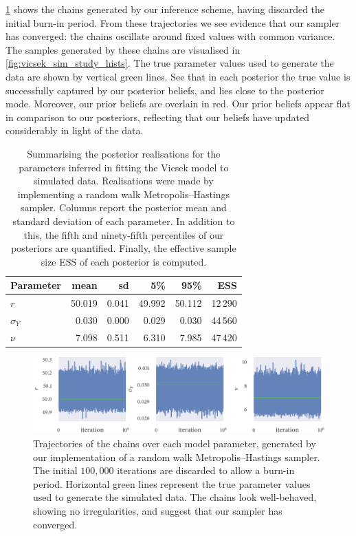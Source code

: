 \cref{fig:vicsek_sim_study_chains} shows the chains generated by our inference scheme,
having discarded the initial burn-in period. From these trajectories we see evidence that
our sampler has converged: the chains oscillate around fixed values with common
variance.  The samples generated by these chains are visualised in
\cref{fig:vicsek_sim_study_hists}.  The true parameter values used to generate the data
are shown by vertical green lines. See that in each posterior the true value is
successfully captured by our posterior beliefs, and lies close to the posterior mode.
Moreover, our prior beliefs are overlain in red. Our prior beliefs appear flat in
comparison to our posteriors, reflecting that our beliefs have updated considerably in
light of the data.
\begin{table}[tb]
  \begin{tabular}{@{}lrrrrr@{}}
    \toprule
    Parameter    & mean   & sd    & 5\%    & 95\%   & ESS \\
    \midrule
    $r$          & 50.019 & 0.041 & 49.992 & 50.112 & 12\,290            \\
    $\sigma_{Y}$ & 0.030  & 0.000 & 0.029  & 0.030  & 44\,560            \\
    $\nu$        & 7.098  & 0.511 & 6.310  & 7.985  & 47\,420            \\
    \bottomrule
  \end{tabular}
  \caption{Summarising the posterior realisations for the parameters inferred in fitting the
    Vicsek model to simulated data. Realisations were made by implementing a random walk
    Metropolis--Hastings sampler. Columns report the posterior mean and standard deviation
    of each parameter. In addition to this, the fifth and ninety-fifth percentiles of our
    posteriors are quantified. Finally, the effective sample size ESS of
    each posterior is computed.}
  \label{tab:vicsek_sim_study_summary}
\end{table}
\begin{figure}[tb]
  \includegraphics{mh_r_trace.pdf}
  \caption{Trajectories of the chains over each model parameter, generated by our
      implementation of a random walk Metropolis--Hastings sampler. The initial $100,000$
      iterations are discarded to allow a burn-in period. Horizontal green lines represent
      the true parameter values used to generate the simulated data. The chains look
      well-behaved, showing no irregularities, and suggest that our sampler has converged.}
  \label{fig:vicsek_sim_study_chains}
\end{figure}
